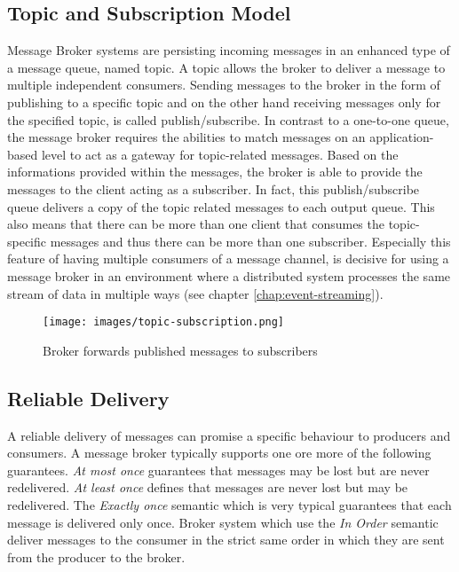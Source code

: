 \newpage
\subsection{Topic and Subscription Model}
\label{intro-messaging-publishsubscribe}
Message Broker systems are persisting incoming messages in an enhanced type of a
message queue, named topic. A topic allows the broker to deliver a message to
multiple independent consumers. Sending messages to the broker in the form of
publishing to a specific topic and on the other hand receiving messages only for
the specified topic, is called publish/subscribe. In contrast to a one-to-one
queue, the message broker requires the abilities to match messages on an
application-based level to act as a gateway for topic-related messages. Based on
the informations provided within the messages, the broker is able to
provide the messages to the client acting as a subscriber. In fact,
this publish/subscribe queue delivers a copy of the topic related messages to
each output queue. This also means that there can be more than one client that
consumes the topic-specific
messages and thus there can be more than one subscriber. Especially this feature
of having multiple consumers of a message channel, is decisive for using a
message broker in an environment where a distributed system processes the same stream of
data in multiple ways (see chapter \ref{chap:event-streaming}).\cite{EIP03} \cite{TAN06}

\begin{figure}[H]
    \centering
    \texttt{[image: images/topic-subscription.png]}
    \caption{Broker forwards published messages to subscribers}
    \label{fig:topic-subscription}
\end{figure}

\subsection{Reliable Delivery}
    A reliable delivery of messages can promise a specific behaviour to producers
    and consumers. A message broker typically supports one ore more of the
    following guarantees.
    \textit{At most once} guarantees that messages may be lost but are never
    redelivered. \textit{At least once} defines that messages are never lost
    but may be redelivered. The \textit{Exactly once} semantic which is very
    typical guarantees that each message is delivered only once. Broker system
    which use the \textit{In Order} semantic deliver messages to the consumer in
    the strict same order in which they are sent from the producer to the broker. 

